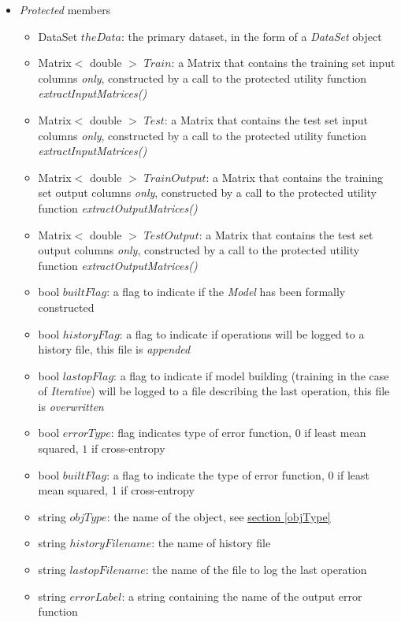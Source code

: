 \documentclass{report}
\def\beginred{\color{red}}
\def\endcolor{\color{black}}
\begin{document}
\begin{itemize}
\begin{itemize}
\end{itemize}

\item {\em Protected} members

\begin{itemize}
\item \beginred DataSet $theData$: the primary dataset, in the form of
      a {\em DataSet} object \endcolor
\item \beginred Matrix$<$ double $>$ $Train$: a Matrix that contains
      the training set input columns {\em only}, constructed by a call
      to the protected utility function {\em extractInputMatrices()}
      \endcolor
\item \beginred Matrix$<$ double $>$ $Test$: a Matrix that contains
      the test set input columns {\em only}, constructed by a call to
      the protected utility function {\em extractInputMatrices()}
      \endcolor
\item \beginred Matrix$<$ double $>$ $TrainOutput$: a Matrix that
      contains the training set output columns {\em only}, constructed
      by a call to the protected utility function {\em
      extractOutputMatrices()} \endcolor
\item \beginred Matrix$<$ double $>$ $TestOutput$: a Matrix that
      contains the test set output columns {\em only}, constructed by
      a call to the protected utility function {\em
      extractOutputMatrices()} \endcolor
\item \beginred bool $builtFlag$: a flag to indicate if the {\em
      Model} has been formally constructed \endcolor
\item \beginred bool $historyFlag$: a flag to indicate if operations
      will be logged to a history file, this file is {\em appended}
      \endcolor
\item bool $lastopFlag$: a flag to indicate if model building
      (training in the case of {\em Iterative}) will be logged to a
      file describing the last operation, this file is {\em
      overwritten}
\item \beginred bool $errorType$: flag indicates type of error
function,
       $0$ if least mean squared, $1$ if cross-entropy \endcolor
\item \beginred bool $builtFlag$: a flag to indicate the type of error
      function, 0 if least mean squared, 1 if cross-entropy \endcolor
\item \beginred string $objType$: the name of the object, see
      \hyperref[objType]{section \ref{objType}} \endcolor
\item string $historyFilename$: the name of history file
\item string $lastopFilename$: the name of the file to log the last
      operation
\item string $errorLabel$: a string containing the name of the output
      error function
\end{itemize}


\end{itemize}
\end{document}
